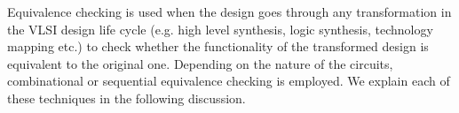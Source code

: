 



\noindent Equivalence checking is used when the design goes through any  transformation in 
the VLSI design life cycle (e.g. high level synthesis, logic synthesis, technology mapping etc.) to
check whether the functionality of the transformed design is equivalent to the original one. Depending on the nature
of the circuits, combinational or sequential equivalence checking is employed. We explain each of these techniques in 
the following discussion.





\newpage



{}


 
